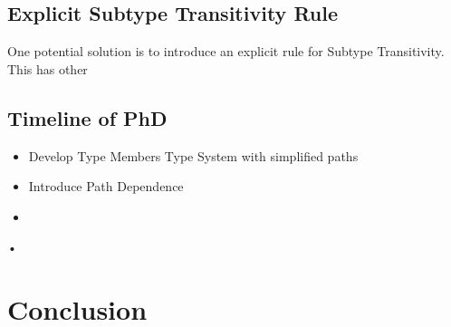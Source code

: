 \documentclass[11pt
              , a4paper
              , twoside
              , openright
              ]{report}
\begin{document}
\section{Explicit Subtype Transitivity Rule}
One potential solution is to introduce an explicit rule for Subtype Transitivity. This has other

\section{Timeline of PhD}
\begin{itemize}
\item
Develop Type Members Type System with simplified paths
\item
Introduce Path Dependence
\item

\end{itemize}•



\chapter{Conclusion}\label{ch:conclusion}



\backmatter



%


\end{document}
